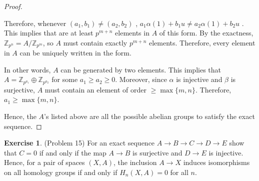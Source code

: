 \documentclass[12pt, psamsfonts]{amsart}
\theoremstyle{definition}
\newtheorem*{exer}{Exercise}
\theoremstyle{remark}
\numberwithin{equation}{section}
\begin{document}
\begin{proof}
\begin{itemize}
      Therefore, whenever $(a_1, b_1) \ne (a_2, b_2)$ , $a_1\alpha(1) + b_1u \ne a_2\alpha(1) + b_2u$ .
      This implies that are at least $p^{m + n}$ elements in $A$ of this form.
      By the exactness, $\mathbb{Z}_{p^n} = A / \mathbb{Z}_{p^m}$, so $A$ must contain exactly $p^{m + n}$ elements.
      Therefore, every element in $A$ can be uniquely written in the form.

      In other words, $A$ can be generated by two elements.
      This implies that $A = \mathbb{Z}_{p^{a_1}} \oplus \mathbb{Z}_{p^{a_2}}$ for some $a_1 \geq a_2 \geq 0$.
      Moreover, since $\alpha$ is injective and $\beta$ is surjective, $A$ must contain an element of order $\geq \max\{ m, n \}$.
      Therefore, $a_1 \geq \max\{ m, n \}$.
  \end{itemize}
  Hence, the $A$'s listed above are all the possible abelian groups to satisfy the exact sequence.
\end{proof}

\begin{exer}{(Problem 15)}
  For an exact sequence $A \rightarrow B \rightarrow C \rightarrow D \rightarrow E$ show that $C = 0$ if and only if the map $A \rightarrow B$ is surjective and $D \rightarrow E$ is injective.
  Hence, for a pair of spaces $(X, A)$, the inclusion $A \rightarrow X$ induces isomorphisms on all homology groups if and only if $H_n(X, A) = 0$ for all $n$.
\end{exer}
\end{document}
